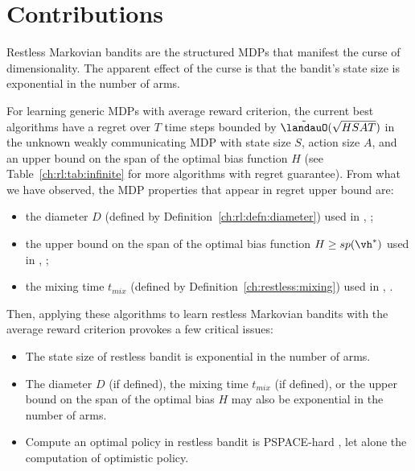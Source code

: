 \section{Contributions}
\label{ch:restless:contribute}

Restless Markovian bandits are the structured MDPs that manifest the curse of dimensionality.
The apparent effect of the curse is that the bandit's state size is exponential in the number of arms.

For learning generic MDPs with average reward criterion, the current best algorithms have a regret over $T$ time steps bounded by $\tilde{\landauO}(\sqrt{HSAT})$ in the unknown weakly communicating MDP with state size $S$, action size $A$, and an upper bound on the span of the optimal bias function $H$ (see Table~\ref{ch:rl:tab:infinite} for more algorithms with regret guarantee).
From what we have observed, the MDP properties that appear in regret upper bound are:
\begin{itemize}
    \item the diameter $D$ (defined by Definition~\ref{ch:rl:defn:diameter}) used in \eg, \cite{jaksch2010near, fruit2020improved};
    \item the upper bound on the span of the optimal bias function $H\ge sp(\vh^*)$ used in \eg, \cite{bartlett2012regal, ouyang2017learning, fruit2018efficient, zhang2019regret};
    \item the mixing time $t_{mix}$ (defined by Definition~\ref{ch:restless:mixing}) used in \eg, \cite{ortner2020regret}.
\end{itemize}
Then, applying these algorithms to learn restless Markovian bandits with the average reward criterion provokes a few critical issues:
\begin{itemize}
    \item The state size of restless bandit is exponential in the number of arms.
    \item The diameter $D$ (if defined), the mixing time $t_{mix}$ (if defined), or the upper bound on the span of the optimal bias $H$ may also be exponential in the number of arms.
    \item Compute an optimal policy in restless bandit is PSPACE-hard \cite{papadimitriou1994complexity}, let alone the computation of optimistic policy.
\end{itemize}
